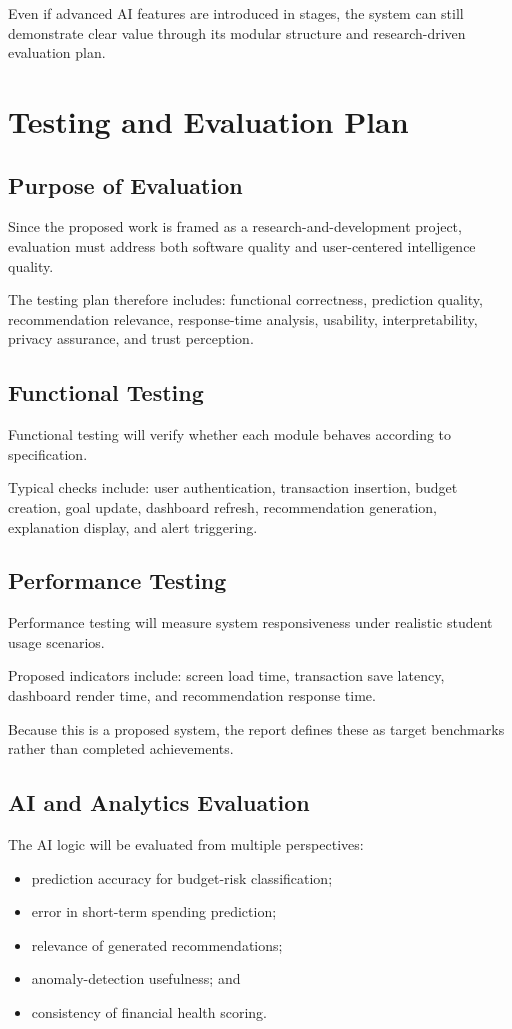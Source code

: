 \documentclass[12pt,a4paper]{report}
\begin{document}
Even if advanced AI features are introduced in stages,
the system can still demonstrate clear value through its modular structure and research-driven evaluation plan.

\chapter{Testing and Evaluation Plan}

\section{Purpose of Evaluation}
Since the proposed work is framed as a research-and-development project,
evaluation must address both software quality and user-centered intelligence quality.

The testing plan therefore includes:
functional correctness,
prediction quality,
recommendation relevance,
response-time analysis,
usability,
interpretability,
privacy assurance,
and trust perception.

\section{Functional Testing}
Functional testing will verify whether each module behaves according to specification.

Typical checks include:
user authentication,
transaction insertion,
budget creation,
goal update,
dashboard refresh,
recommendation generation,
explanation display,
and alert triggering.

\section{Performance Testing}
Performance testing will measure system responsiveness under realistic student usage scenarios.

Proposed indicators include:
screen load time,
transaction save latency,
dashboard render time,
and recommendation response time.

Because this is a proposed system,
the report defines these as target benchmarks rather than completed achievements.

\section{AI and Analytics Evaluation}
The AI logic will be evaluated from multiple perspectives:
\begin{itemize}[leftmargin=2em]
\item prediction accuracy for budget-risk classification;
\item error in short-term spending prediction;
\item relevance of generated recommendations;
\item anomaly-detection usefulness;
and
\item consistency of financial health scoring.
\end{itemize}
\end{document}
